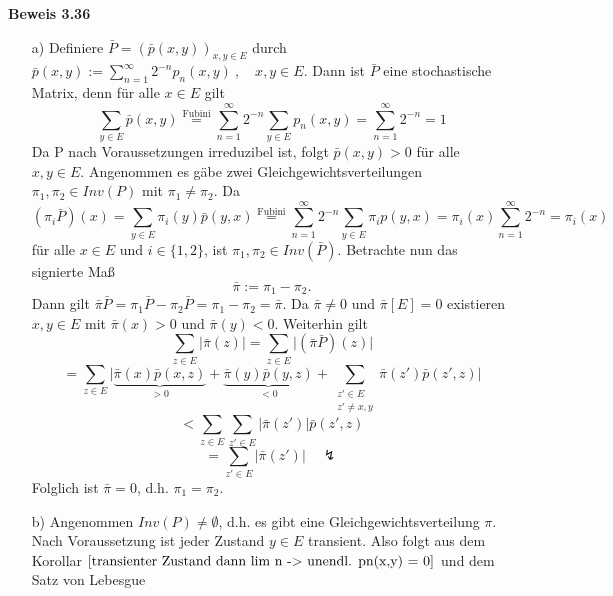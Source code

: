 \textbf{Beweis 3.36}
\mbox{}
\begin{itemize}
\item[a)] Definiere $\bar{P} = (\bar{p}(x,y))_{x,y \in E}$ durch $\bar{p}(x,y) := \sum_{n=1}^{\infty} 2^{-n} p_{n}(x,y) \:, \quad x,y \in E$. Dann ist $\bar{P}$ eine stochastische Matrix, denn für alle $x \in E$ gilt
\begin{equation*}
\sum_{y \in E} \bar{p} (x,y) \stackrel{\mathrm{Fubini}}{=} \sum_{n=1}^{\infty} 2^{-n} \sum_{y \in E} p_{n}(x,y) = \sum_{n=1}^{\infty} 2^{-n} = 1
\end{equation*}
Da P nach Voraussetzungen irreduzibel ist, folgt $\bar{p}(x,y)>0$ für alle $x,y \in E$. Angenommen es gäbe zwei Gleichgewichtsverteilungen $\pi_{1},\pi_{2} \in Inv(P)$ mit $\pi_{1} \neq \pi_{2}$. Da
\begin{equation*}
(\pi_{i} \bar{P})(x) = \sum_{y \in E} \pi_{i}(y) \bar{p}(y,x) \stackrel{\mathrm{Fubini}}{=} \sum_{n=1}^{\infty} 2^{-n} \sum_{y \in E} \pi_{i} p(y,x) = \pi_{i}(x) \sum_{n=1}^{\infty} 2^{-n} = \pi_{i}(x)
\end{equation*} 
für alle $x \in E$ und $i \in \lbrace 1,2 \rbrace$, ist $\pi_{1}, \pi_{2} \in Inv(\bar{P})$. Betrachte nun das signierte Maß
\begin{equation*}
\bar{\pi} := \pi_{1} - \pi_{2}.
\end{equation*}
Dann gilt $\bar{\pi} \bar{P} = \pi_{1} \bar{P} - \pi_{2} \bar{P} = \pi_{1} - \pi_{2} = \bar{\pi}$. Da $\bar{\pi} \neq 0$ und $\bar{\pi}[E]=0$ existieren $x,y \in E$ mit $\bar{\pi}(x) > 0$ und $\bar{\pi}(y) < 0$. Weiterhin gilt
\begin{equation*}
\sum_{z \in E} \vert \bar{\pi}(z) \vert = \sum_{z \in E} \vert (\bar{\pi}\bar{P})(z) \vert
\end{equation*}
\begin{equation*}
= \sum_{z \in E}\vert \underbrace{\bar{\pi}(x)\bar{p}(x,z)}_{>0} + \underbrace{\bar{\pi}(y)\bar{p}(y,z)}_{<0} +  \sum_{\substack{ z' \in E \\ z' \neq x,y } }\bar{\pi}(z')\bar{p}(z',z) \vert
\end{equation*}
\begin{equation*}
< \sum_{z \in E} \sum_{z' \in E} \vert \bar{\pi}(z') \vert \bar{p}(z',z)
\end{equation*}
\begin{equation*}
= \sum_{z' \in E} \vert \bar{\pi}(z') \vert \quad \lightning
\end{equation*}
Folglich ist $\bar{\pi}=0$, d.h. $\pi_{1} = \pi_{2}$.
\item[b)] Angenommen $Inv(P) \neq \emptyset$, d.h. es gibt eine Gleichgewichtsverteilung $\pi$. Nach Voraussetzung ist jeder Zustand $y \in E$ transient. Also folgt aus dem Korollar $\ref{transienter Zustand dann lim n -> unendl. pn(x,y) = 0}$ und dem Satz von Lebesgue

\end{itemize}
